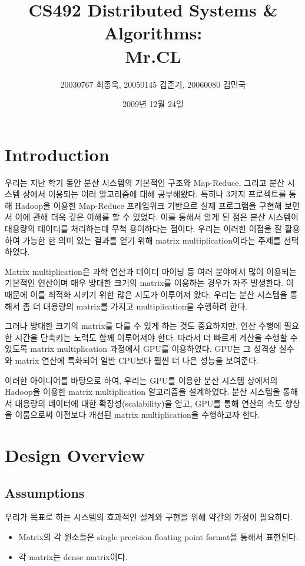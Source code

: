 \documentclass[a4paper]{article}
\begin{document}
\title{CS492 Distributed Systems \& Algorithms:\\ \textbf{Mr.CL}}
\author{20030767 최종욱, 20050145 김준기, 20060080 김민국}
\date{2009년 12월 24일}
\maketitle

\begin{multicols}{2}
\section{Introduction}
우리는 지난 학기 동안 분산 시스템의 기본적인 구조와 Map-Reduce, 그리고 분산 시스템 상에서 이용되는 여러 알고리즘에 대해 공부해왔다.
특히나 3가지 프로젝트를 통해 Hadoop을 이용한 Map-Reduce 프레임워크 기반으로 실제 프로그램을 구현해 보면서 이에 관해 더욱 깊은 이해를 할 수 있었다.
이를 통해서 알게 된 점은 분산 시스템이 대용량의 데이터를 처리하는데 무척 용이하다는 점이다.
우리는 이러한 이점을 잘 활용하여 가능한 한 의미 있는 결과를 얻기 위해 matrix multiplication이라는 주제를 선택하였다.

Matrix multiplication은 과학 연산과 데이터 마이닝 등 여러 분야에서 많이 이용되는 기본적인 연산이며 매우 방대한 크기의 matrix를 이용하는 경우가 자주 발생한다.
이 때문에 이를 최적화 시키기 위한 많은 시도가 이루어져 왔다.
우리는 분산 시스템을 통해서 좀 더 대용량의 matrix를 가지고 multiplication을 수행하려 한다.

그러나 방대한 크기의 matrix를 다룰 수 있게 하는 것도 중요하지만, 연산 수행에 필요한 시간을 단축키는 노력도 함께 이루어져야 한다.
따라서 더 빠르게 계산을 수행할 수 있도록 matrix multiplication 과정에서 GPU를 이용하였다.
GPU는 그 성격상 실수와 matrix 연산에 특화되어 일반 CPU보다 훨씬 더 나은 성능을 보여준다.

이러한 아이디어를 바탕으로 하여, 우리는 GPU를 이용한 분산 시스템 상에서의 Hadoop을 이용한 matrix multiplication 알고리즘을 설계하였다.
분산 시스템을 통해서 대용량의 데이터에 대한 확장성(scalability)을 얻고, GPU를 통해 연산의 속도 향상을 이룸으로써 이전보다 개선된 matrix multiplication을 수행하고자 한다. 

\section{Design Overview}
\subsection{Assumptions}
우리가 목표로 하는 시스템의 효과적인 설계와 구현을 위해 약간의 가정이 필요하다.
\begin{itemize}
	\item Matrix의 각 원소들은 single precision floating point format을 통해서 표현된다.
	\item 각 matrix는 dense matrix이다.
\end{itemize}


\end{multicols}
\end{document}
